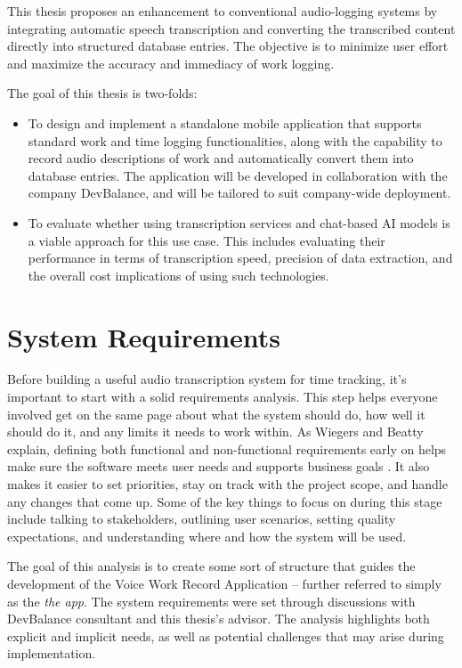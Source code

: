 \documentclass[
  digital,     %
  oneside,     %
  nosansbold,  %
  nocolorbold, %
  lof,         %
  lot,         %
]{fithesis4}
\begin{document}
This thesis proposes an enhancement to conventional audio-logging systems by integrating automatic speech transcription and converting the transcribed content directly into structured database entries. The objective is to minimize user effort and maximize the accuracy and immediacy of work logging.

The goal of this thesis is two-folds:
\begin{itemize}
    \item To design and implement a standalone mobile application that supports standard work and time logging functionalities, along with the capability to record audio descriptions of work and automatically convert them into database entries. The application will be developed in collaboration with the company DevBalance, and will be tailored to suit company-wide deployment.
    \item To evaluate whether using transcription services and chat-based AI models is a viable approach for this use case. This includes evaluating their performance in terms of transcription speed, precision of data extraction, and the overall cost implications of using such technologies.
\end{itemize}

\chapter{System Requirements}

Before building a useful audio transcription system for time tracking, it’s important to start with a solid requirements analysis. This step helps everyone involved get on the same page about what the system should do, how well it should do it, and any limits it needs to work within. As Wiegers and Beatty explain, defining both functional and non-functional requirements early on helps make sure the software meets user needs and supports business goals \cite{wiegers13}. It also makes it easier to set priorities, stay on track with the project scope, and handle any changes that come up. Some of the key things to focus on during this stage include talking to stakeholders, outlining user scenarios, setting quality expectations, and understanding where and how the system will be used.

The goal of this analysis is to create some sort of structure that guides the development of the Voice Work Record Application – further referred to simply as the \textit{the app}. The system requirements were set through discussions with DevBalance consultant and this thesis's advisor. The analysis highlights both explicit and implicit needs, as well as potential challenges that may arise during implementation.
\end{document}
